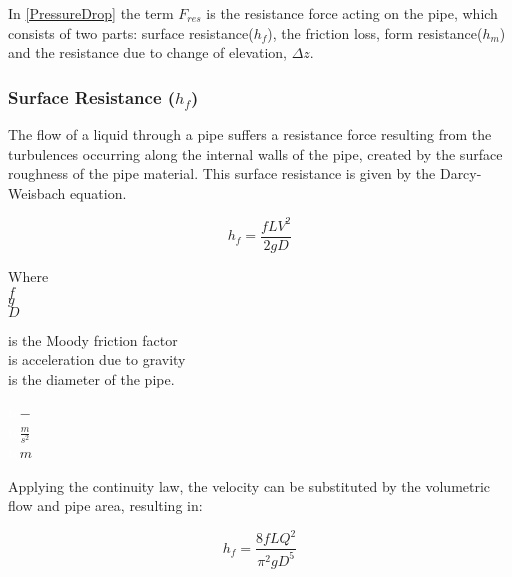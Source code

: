 In \eqref{PressureDrop} the term $F_{res}$ is the resistance force acting on the 
pipe, which consists of two parts: surface resistance($h_{f}$), the friction 
loss, form resistance($h_{m}$) and the resistance due to change of elevation, $\Delta z$. 


\subsubsection{Surface Resistance ($h_f$)} 
The flow of a liquid through a pipe suffers a resistance force resulting from 
the turbulences occurring along the internal walls of the pipe, created by the surface roughness of the pipe material. This surface 
resistance is given by the Darcy-Weisbach equation.

\begin{equation}
  h_f = \frac{fLV^2}{2gD}
  \label{Darcy}
\end{equation}

 \begin{minipage}[t]{0.20\textwidth}
Where\\
\hspace*{8mm} $f$ \\
\hspace*{8mm} $g$ \\
\hspace*{8mm} $D$ 
\end{minipage}
\begin{minipage}[t]{0.68\textwidth}
\vspace*{2mm}
is the Moody friction factor\\ 
is acceleration due to gravity\\
is the diameter of the pipe.

\end{minipage}
\begin{minipage}[t]{0.10\textwidth}
\vspace*{2mm}
\textcolor{White}{te}$\unit{-}$\\
\textcolor{White}{te}$\unit{\frac{m}{s^2}}$\\
\textcolor{White}{te}$\unit{m}$
\end{minipage}

Applying the continuity law, the velocity can be substituted by the volumetric flow and pipe area, resulting in:

\begin{equation}
  h_f = \frac{8fLQ^2}{\pi^{2}gD^5}
  \label{DarcyWeisbach}
\end{equation} 
 
